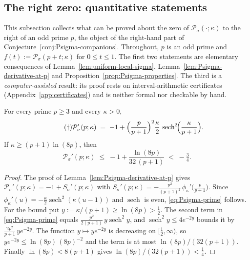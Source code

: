
\subsection{The right zero: quantitative statements}\label{subsec:Psigma-right}

This subsection collects what can be proved about the zero of $\mathcal P_\sigma(\cdot;\kappa)$ to the right of an odd prime $p$, the object of the right-hand part of Conjecture~\ref{conj:Psigma-companions}. Throughout, $p$ is an odd prime and $f(t):=\mathcal P_\sigma(p+t;\kappa)$ for $0\le t\le 1$. The first two statements are elementary consequences of Lemma~\ref{lem:uniform-local-sigma}, Lemma~\ref{lem:Psigma-derivative-at-p} and Proposition~\ref{prop:Psigma-properties}. The third is a \emph{computer-assisted} result: its proof rests on interval-arithmetic certificates (Appendix~\ref{app:certificates}) and is neither formal nor checkable by hand.

\begin{lemma}\label{lem:Psigma-prime-explicit}
For every prime $p\ge3$ and every $\kappa>0$,
\begin{equation}\tag{$\dagger$}\label{eq:Psigma-prime}
\mathcal P_\sigma'(p;\kappa)\;=\;-1+\Bigl(\frac{p}{p+1}\Bigr)^{2}\frac{\kappa}{2}\,\operatorname{sech}^{2}\!\Bigl(\frac{\kappa}{p+1}\Bigr).
\end{equation}
If $\kappa\ge (p+1)\ln(8p)$, then
\[
\mathcal P_\sigma'(p;\kappa)\;\le\;-1+\frac{\ln(8p)}{32\,(p+1)}\;<\;-\tfrac34 .
\]
\end{lemma}

\begin{proof}
The proof of Lemma~\ref{lem:Psigma-derivative-at-p} gives $\mathcal P_\sigma'(p;\kappa)=-1+S_\sigma'(p;\kappa)$ with $S_\sigma'(p;\kappa)=-\frac{p^{2}}{(p+1)^{2}}\,\phi_\kappa'\bigl(\tfrac{p}{p+1}\bigr)$. Since $\phi_\kappa'(u)=-\tfrac{\kappa}{2}\operatorname{sech}^2(\kappa(u-1))$ and $\operatorname{sech}$ is even, \eqref{eq:Psigma-prime} follows. For the bound put $y:=\kappa/(p+1)\ge\ln(8p)>\tfrac12$. The second term in \eqref{eq:Psigma-prime} equals $\frac{p^2}{2(p+1)}\,y\operatorname{sech}^2 y$, and $\operatorname{sech}^2y\le4e^{-2y}$ bounds it by $\frac{2p^2}{p+1}\,ye^{-2y}$. The function $y\mapsto ye^{-2y}$ is decreasing on $[\tfrac12,\infty)$, so $ye^{-2y}\le \ln(8p)\,(8p)^{-2}$ and the term is at most $\ln(8p)/(32(p+1))$. Finally $\ln(8p)<8(p+1)$ gives $\ln(8p)/(32(p+1))<\tfrac14$.
\end{proof}

